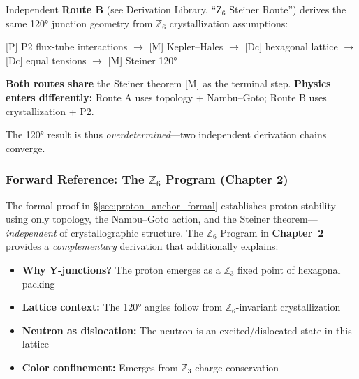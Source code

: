 
\begin{tcolorbox}[colback=blue!5!white, colframe=blue!50!black,
                  title={\textbf{Convergence with Route B (Preview)}}]
\label{box:routeA_convergence_preview}
Independent \textbf{Route B} (see Derivation Library, ``Z$_6$ Steiner Route'') derives the same 120° junction
geometry from $\mathbb{Z}_6$ crystallization assumptions:
\begin{center}
[P] P2 flux-tube interactions $\to$ [M] Kepler--Hales $\to$ [Dc] hexagonal lattice $\to$
[Dc] equal tensions $\to$ [M] Steiner 120°
\end{center}

\textbf{Both routes share} the Steiner theorem [M] as the terminal step.
\textbf{Physics enters differently:} Route A uses topology + Nambu--Goto;
Route B uses crystallization + P2.

The 120° result is thus \emph{overdetermined}---two independent derivation chains converge.
\end{tcolorbox}


\subsubsection{Forward Reference: The $\mathbb{Z}_6$ Program (Chapter 2)}

The formal proof in \S\ref{sec:proton_anchor_formal} establishes proton stability using only
topology, the Nambu--Goto action, and the Steiner theorem---\emph{independent} of crystallographic
structure. The $\mathbb{Z}_6$ Program in \textbf{Chapter~2} provides a \emph{complementary}
derivation that additionally explains:

\begin{itemize}[nosep]
  \item \textbf{Why Y-junctions?} The proton emerges as a $\mathbb{Z}_3$ fixed point of hexagonal packing
  \item \textbf{Lattice context:} The 120° angles follow from $\mathbb{Z}_6$-invariant crystallization
  \item \textbf{Neutron as dislocation:} The neutron is an excited/dislocated state in this lattice
  \item \textbf{Color confinement:} Emerges from $\mathbb{Z}_3$ charge conservation
\end{itemize}

